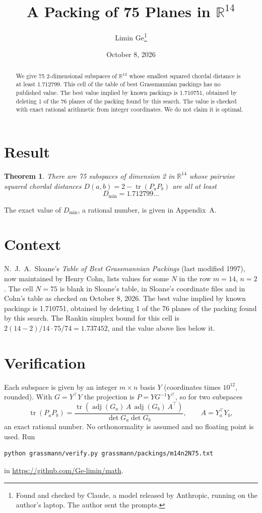 \documentclass[11pt,a4paper]{article}
\title{A Packing of 75 Planes in $\mathbb{R}^{14}$}
\author{Limin Ge\thanks{Found and checked by Claude, a model released by Anthropic, running on the author's laptop. The author sent the prompts.}}
\date{October 8, 2026}
\newtheorem*{theorem}{Theorem}
\begin{document}
\maketitle
\begin{abstract}
We give 75 2-dimensional subspaces of $\mathbb{R}^{14}$ whose smallest squared chordal distance is at least 1.712799. This cell of the table of best Grassmannian packings has no published value. The best value implied by known packings is 1.710751, obtained by deleting 1 of the 76 planes of the packing found by this search. The value is checked with exact rational arithmetic from integer coordinates. We do not claim it is optimal.
\end{abstract}

\section{Result}
\begin{theorem}
There are 75 subspaces of dimension 2 in $\mathbb{R}^{14}$ whose pairwise squared chordal distances $D(a,b) = 2 - \operatorname{tr}(P_aP_b)$ are all at least
\[ D_{\min} = 1.712799\ldots \]
\end{theorem}
The exact value of $D_{\min}$, a rational number, is given in Appendix~A.


\section{Context}
N.~J.~A.~Sloane's \emph{Table of Best Grassmannian Packings} (last modified 1997), now maintained by Henry Cohn, lists values for some $N$ in the row $m=14$, $n=2$. The cell $N=75$ is blank in Sloane's table, in Sloane's coordinate files and in Cohn's table as checked on October 8, 2026. The best value implied by known packings is 1.710751, obtained by deleting 1 of the 76 planes of the packing found by this search. The Rankin simplex bound for this cell is $2(14-2)/14\cdot 75/74 = 1.737452$, and the value above lies below it.


\section{Verification}
Each subspace is given by an integer $m\times n$ basis $Y$ (coordinates times $10^{12}$, rounded). With $G=Y^\top Y$ the projection is $P=YG^{-1}Y^\top$, so for two subspaces
\[ \operatorname{tr}(P_aP_b)=\frac{\operatorname{tr}(\operatorname{adj}(G_a)\,A\,\operatorname{adj}(G_b)\,A^\top)}{\det G_a\det G_b},\qquad A=Y_a^\top Y_b, \]
an exact rational number. No orthonormality is assumed and no floating point is used. Run
\begin{verbatim}
python grassmann/verify.py grassmann/packings/m14n2N75.txt
\end{verbatim}
in \url{https://github.com/Ge-limin/math}.
\end{document}
